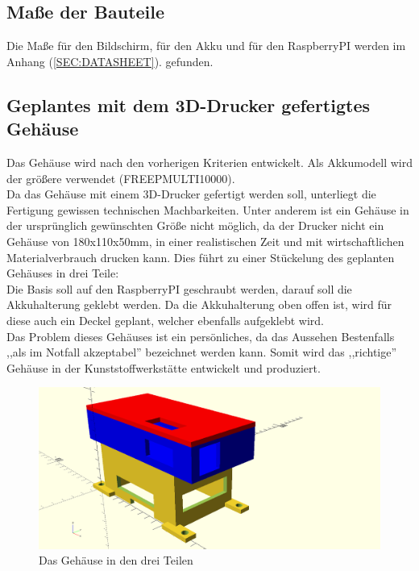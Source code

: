 \documentclass[12pt,a4paper]{article}
\begin{document}
{\subsection{Maße der Bauteile}

Die Maße für den Bildschirm, für den Akku und für den RaspberryPI werden im Anhang  (\ref{SEC:DATASHEET}).
gefunden.

\subsection{Geplantes mit dem 3D-Drucker gefertigtes Gehäuse}

Das Gehäuse wird nach den vorherigen Kriterien entwickelt.  Als Akkumodell wird der größere verwendet (FREEPMULTI10000).\\
Da das Gehäuse mit einem 3D-Drucker gefertigt werden soll, unterliegt die Fertigung gewissen technischen Machbarkeiten. Unter anderem ist ein Gehäuse in der ursprünglich gewünschten Größe nicht möglich, da der Drucker nicht ein Gehäuse von 180x110x50mm, in einer realistischen Zeit und mit wirtschaftlichen Materialverbrauch drucken kann. Dies führt zu einer Stückelung des geplanten Gehäuses in drei Teile: \\
Die Basis soll auf den RaspberryPI geschraubt werden, darauf soll die Akkuhalterung geklebt werden. Da die Akkuhalterung oben offen ist, wird für diese auch ein Deckel geplant, welcher ebenfalls aufgeklebt wird. \\
Das Problem dieses Gehäuses ist ein persönliches, da das Aussehen Bestenfalls ,,als im Notfall akzeptabel'' bezeichnet werden kann. Somit wird das ,,richtige'' Gehäuse in der Kunststoffwerkstätte entwickelt und produziert. 

\begin{figure}[H]
  \centering
		\includegraphics[scale=0.6, angle=90]{graphics/gehaeuse.png}
		\caption{Das Gehäuse in den drei Teilen}
		\label{fig:case-3D}
\end{figure}

}
\end{document}
